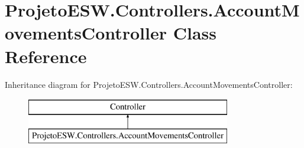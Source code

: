 \hypertarget{class_projeto_e_s_w_1_1_controllers_1_1_account_movements_controller}{}\section{Projeto\+E\+S\+W.\+Controllers.\+Account\+Movements\+Controller Class Reference}
\label{class_projeto_e_s_w_1_1_controllers_1_1_account_movements_controller}
Inheritance diagram for Projeto\+E\+S\+W.\+Controllers.\+Account\+Movements\+Controller\+:\begin{figure}[H]
\begin{center}
\leavevmode
\includegraphics[height=2.000000cm]{class_projeto_e_s_w_1_1_controllers_1_1_account_movements_controller}
\end{center}
\end{figure}
